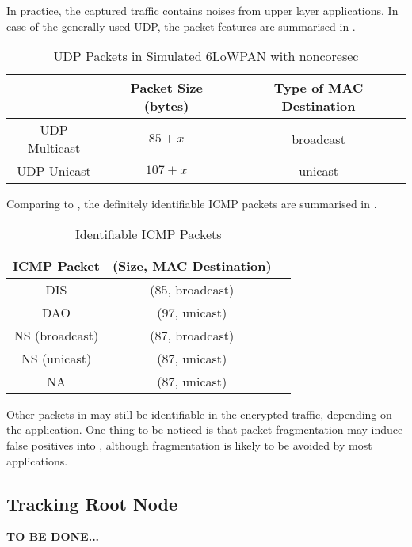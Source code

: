 In practice, the captured traffic contains noises from upper layer applications. In case of the generally used UDP\cite{rfc768}, the packet features are summarised in .

\begin{table}[ht!]
	\center
	{
		\begin{tabular}{|c|c|c|}
			\hline
			       & Packet Size (bytes) & Type of MAC Destination \\ \hline
			UDP Multicast   & $85+x$                  & broadcast                       \\ \hline
			UDP Unicast   & $107+x$                  & unicast                       \\ \hline
		\end{tabular}
	}
	\caption{UDP Packets in Simulated 6LoWPAN with noncoresec}
	\label{UDPPacketFeature}
\end{table}

Comparing  to , the definitely identifiable ICMP packets are summarised in .

\begin{table}[ht!]
	\center
	{
		\begin{tabular}{|c|c|c|}
			\hline
			ICMP Packet & (Size, MAC Destination)\\ \hline
			DIS   & (85, broadcast)                       \\ \hline
			DAO   & (97, unicast)                       \\ \hline
			NS (broadcast)   & (87, broadcast)                       \\ \hline	
			NS (unicast)   & (87, unicast)                       \\ \hline
			NA 	& (87, unicast)                       \\ \hline
		\end{tabular}
	}
	\caption{Identifiable ICMP Packets}
	\label{TAICMP}
\end{table}

Other packets in  may still be identifiable in the encrypted traffic, depending on the application. One thing to be noticed is that packet fragmentation may induce false positives into , although fragmentation is likely to be avoided by most applications.

\subsection{Tracking Root Node}
\textbf{TO BE DONE...}